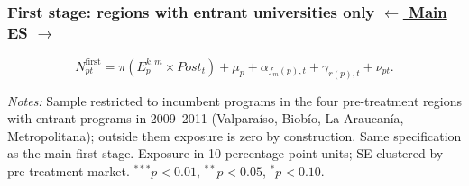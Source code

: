 \documentclass{beamer}
\begin{document}
\begin{frame}[label=sua-fs-lvl-entrant]

\frametitle{
    First stage: regions with entrant universities only
    \hfill
    \hyperlink{sua-first-stage}{\scriptsize\color{blue}$\leftarrow$ Main}
    \hyperlink{sua-es-lvl-entrant}{\scriptsize\color{blue}ES $\rightarrow$}
}

\centering

\vspace{-0.2cm}

{\small
\begin{equation*}
N^{\mathrm{first}}_{pt}
=
\pi
\left(
E^{k,m}_{p}\times Post_t
\right)
+\mu_p
+\alpha_{f_m(p),t}
+\gamma_{r(p),t}
+\nu_{pt}.
\end{equation*}
}

\vspace{-0.3cm}

\resizebox{0.62\textwidth}{!}{}

\vspace{0.05cm}

\parbox{0.97\textwidth}{%
\tiny
\textit{Notes:}
Sample restricted to incumbent programs in the four pre-treatment regions with entrant programs in 2009--2011 (Valpara\'iso, Biob\'io, La Araucan\'ia, Metropolitana); outside them exposure is zero by construction.
Same specification as the main first stage. Exposure in 10 percentage-point units; SE clustered by pre-treatment market.
$^{***}p<0.01$, $^{**}p<0.05$, $^{*}p<0.10$.
}

\end{frame}
\end{document}
